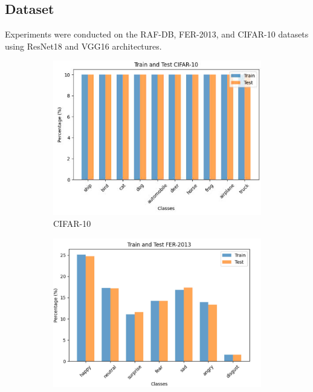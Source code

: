 \documentclass[pdflatex,sn-mathphys-num]{sn-jnl}%
\theoremstyle{thmstyleone}%
\theoremstyle{thmstyletwo}%
\theoremstyle{thmstylethree}%
\begin{document}
\subsection{Dataset}

Experiments were conducted on the RAF-DB, FER-2013, and CIFAR-10 datasets using ResNet18 and VGG16 architectures.
\begin{figure}[h]  
    \centering  
    \begin{subfigure}{0.3\textwidth}  
        \centering  
        \includegraphics[width=\linewidth]{Figures/CIFA_Distribution.jpg}
        \caption{CIFAR-10}  
        \label{fig:cifar-distribution}  
    \end{subfigure}  
    \hfill  
    \begin{subfigure}{0.3\textwidth}  
        \centering  
        \includegraphics[width=\linewidth]{Figures/FER_Distribution.jpg}

\end{subfigure}
\end{figure}
\end{document}

